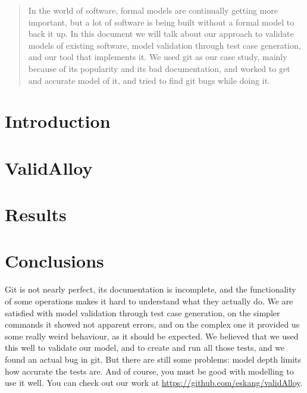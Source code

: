 



\maketitle


\begin{abstract}
In the world of software, formal models are continually getting more important, but a lot of  software is being built without a formal model to back it up. In this document we will talk about our approach to validate models of existing software, model validation through test case generation, and our tool that implements it. We used git as our case study, mainly because of its popularity and its bad documentation, and worked to get and accurate model of it, and tried to find git bugs while doing it.
\end{abstract}

\tableofcontents
\clearpage

\listoffigures
\clearpage
\chapter{Introduction}



\chapter{ValidAlloy}



\chapter{Results}


\chapter{Conclusions}
Git is not nearly perfect, its documentation is incomplete, and the functionality of some operations makes it hard to understand what they actually do. 
We are satisfied with model validation through test case generation, on the simpler commands it showed not apparent errors, and on the complex one it provided us some really weird behaviour, as it should be expected. 
We believed that we used this well to validate our model, and to create and run all those tests, and we found an actual bug in git. But there are still some problems: model depth limits how accurate the tests are. And of course, you must be good with modelling to use it well.
You can check out our work at \href{https://github.com/eskang/validAlloy}{https://github.com/eskang/validAlloy}.

